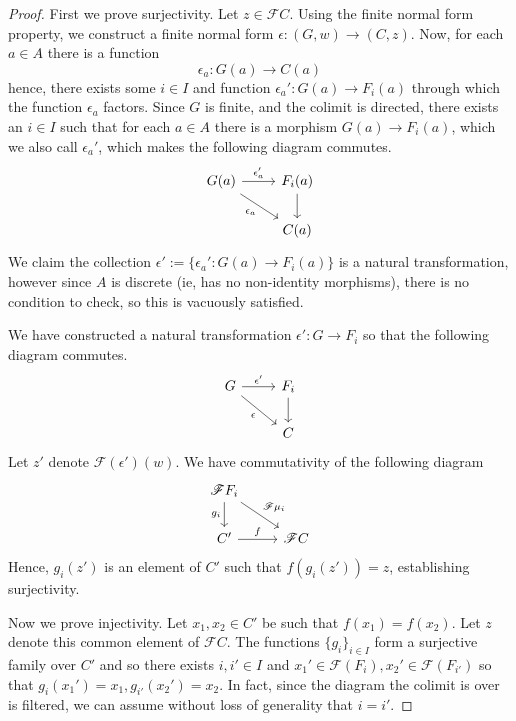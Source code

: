 \documentclass[12pt]{article}
\theoremstyle{plain}
\theoremstyle{definition}
\newcommand{\scr}[1]{\mathscr{#1}}
\newcommand{\lto}{\longrightarrow}
\begin{document}
\begin{proof}
		First we prove surjectivity. Let $z \in \scr{F}C$. Using the finite normal form property, we construct a finite normal form $\epsilon: (G, w) \lto (C, z)$. Now, for each $a \in A$ there is a function
		\begin{equation}
			\epsilon_a: G(a) \lto C(a)
			\end{equation}
		hence, there exists some $i \in I$ and function $\epsilon_a': G(a) \lto F_i(a)$ through which the function $\epsilon_a$ factors. Since $G$ is finite, and the colimit is directed, there exists an $i \in I$ such that for each $a \in A$ there is a morphism $G(a) \lto F_i(a)$, which we also call $\epsilon_a'$, which makes the following diagram commutes.
		\begin{equation}
			\begin{tikzcd}
				G(a)\arrow[r,"{\epsilon_a'}"]\arrow[dr,swap,"{\epsilon_a}"] & F_i(a)\arrow[d]\\
				& C(a)
				\end{tikzcd}
			\end{equation}
		We claim the collection $\epsilon' := \{\epsilon_a': G(a) \lto F_i(a)\}$ is a natural transformation, however since $A$ is discrete (ie, has no non-identity morphisms), there is no condition to check, so this is vacuously satisfied.
		
		We have constructed a natural transformation $\epsilon': G \lto F_i$ so that the following diagram commutes.
		\begin{equation}
			\begin{tikzcd}
				G\arrow[r,"{\epsilon'}"]\arrow[dr,swap,"{\epsilon}"] & F_i\arrow[d]\\
				& C
				\end{tikzcd}
			\end{equation}
		Let $z'$ denote $\scr{F}(\epsilon')(w)$. We have commutativity of the following diagram
		\begin{equation}
			\begin{tikzcd}
				\scr{F}F_i\arrow[d,swap,"{g_i}"]\arrow[dr,"{\scr{F}\mu_i}"]\\
				C'\arrow[r,"{f}"] & \scr{F} C
				\end{tikzcd}
			\end{equation}
		Hence, $g_i(z')$ is an element of $C'$ such that $f(g_i(z')) = z$, establishing surjectivity.
		
		Now we prove injectivity. Let $x_1,x_2 \in C'$ be such that $f(x_1) = f(x_2)$. Let $z$ denote this common element of $\scr{F}C$. The functions $\{ g_i\}_{i \in I}$ form a surjective family over $C'$ and so there exists $i,i' \in I$ and $x_1' \in \scr{F}(F_i), x_2' \in \scr{F}(F_{i'})$ so that $g_i(x_1') = x_1, g_{i'}(x_2') = x_2$. In fact, since the diagram the colimit is over is filtered, we can assume without loss of generality that $i = i'$.
		

\end{proof}
\end{document}
